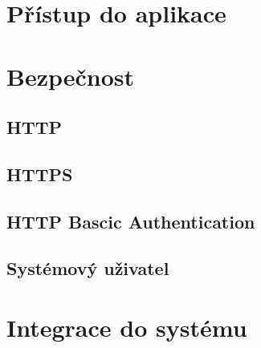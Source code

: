 \section{Přístup do aplikace}
\section{Bezpečnost}
    \subsection{HTTP}
    \subsection{HTTPS}
    \subsection{HTTP Bascic Authentication}
    \subsection{Systémový uživatel}
\section{Integrace do systému}